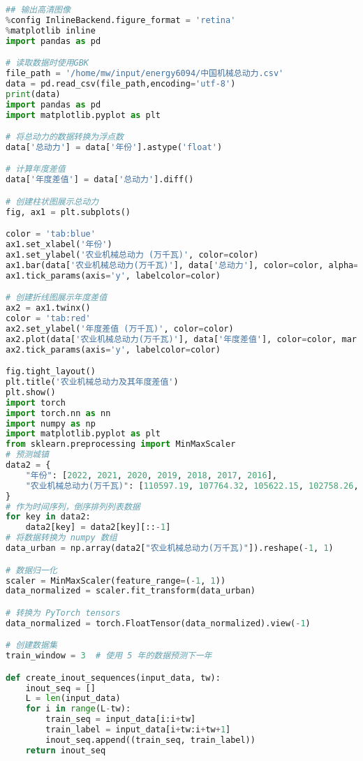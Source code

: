 \begin{lstlisting}[language=python,caption={中国机械总量}]
## 输出高清图像
%config InlineBackend.figure_format = 'retina'
%matplotlib inline
import pandas as pd

# 读取数据时使用GBK
file_path = '/home/mw/input/energy6094/中国机械总动力.csv'
data = pd.read_csv(file_path,encoding='utf-8')
print(data)
import pandas as pd
import matplotlib.pyplot as plt

# 将总动力的数据转换为浮点数
data['总动力'] = data['年份'].astype('float')

# 计算年度差值
data['年度差值'] = data['总动力'].diff()

# 创建柱状图展示总动力
fig, ax1 = plt.subplots()

color = 'tab:blue'
ax1.set_xlabel('年份')
ax1.set_ylabel('农业机械总动力 (万千瓦)', color=color)
ax1.bar(data['农业机械总动力(万千瓦)'], data['总动力'], color=color, alpha=0.6)
ax1.tick_params(axis='y', labelcolor=color)

# 创建折线图展示年度差值
ax2 = ax1.twinx()  
color = 'tab:red'
ax2.set_ylabel('年度差值 (万千瓦)', color=color)  
ax2.plot(data['农业机械总动力(万千瓦)'], data['年度差值'], color=color, marker='o', linestyle='-', linewidth=2)
ax2.tick_params(axis='y', labelcolor=color)

fig.tight_layout()  
plt.title('农业机械总动力及其年度差值')
plt.show()
import torch
import torch.nn as nn
import numpy as np
import matplotlib.pyplot as plt
from sklearn.preprocessing import MinMaxScaler
# 预测城镇
data2 = {
    "年份": [2022, 2021, 2020, 2019, 2018, 2017, 2016],
    "农业机械总动力(万千瓦)": [110597.19, 107764.32, 105622.15, 102758.26, 100371.74, 98783.35,97245.59],
}
# 作为时间序列，倒序排列列表数据
for key in data2:
    data2[key] = data2[key][::-1]
# 将数据转换为 numpy 数组
data_urban = np.array(data2["农业机械总动力(万千瓦)"]).reshape(-1, 1)

# 数据归一化
scaler = MinMaxScaler(feature_range=(-1, 1))
data_normalized = scaler.fit_transform(data_urban)

# 转换为 PyTorch tensors
data_normalized = torch.FloatTensor(data_normalized).view(-1)

# 创建数据集
train_window = 3  # 使用 5 年的数据预测下一年

def create_inout_sequences(input_data, tw):
    inout_seq = []
    L = len(input_data)
    for i in range(L-tw):
        train_seq = input_data[i:i+tw]
        train_label = input_data[i+tw:i+tw+1]
        inout_seq.append((train_seq, train_label))
    return inout_seq


\end{lstlisting}
